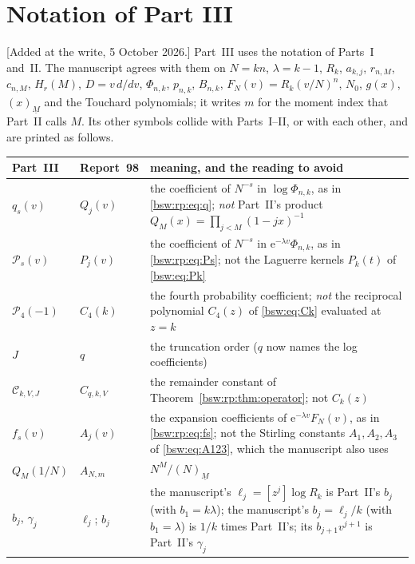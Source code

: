 \documentclass[11pt,letterpaper]{article}
\theoremstyle{definition}
\theoremstyle{remark}
\newcommand{\ee}{\mathrm e}
\newcommand{\fall}[2]{(#1)_{\underline{#2}}}
\begin{document}
\section{Notation of Part III}\label{bsw:ut:sec:notation}

[Added at the write, 5 October 2026.]  Part~III uses the notation of
Parts~I and~II.  The manuscript agrees with them on $N=kn$, $\lambda=k-1$,
$R_k$, $a_{k,j}$, $r_{n,M}$, $c_{n,M}$, $H_r(M)$, $D=v\,d/dv$,
$\Phi_{n,k}$, $p_{n,k}$, $B_{n,k}$, $F_N(v)=R_k(v/N)^n$, $N_0$, $g(x)$,
$\fall xM$ and the Touchard polynomials; it writes $m$ for the moment index
that Part~II calls $M$.  Its other
symbols collide with Parts~I--II, or with each other, and are printed
as follows.

\begin{center}\small
\begin{tabular}{>{\raggedright\arraybackslash}p{}>{\raggedright\arraybackslash}p{}>{\raggedright\arraybackslash}p{}}
\toprule
Part~III & Report~98 & meaning, and the reading to avoid\\
\midrule
$q_s(v)$ & $Q_j(v)$ & the coefficient of $N^{-s}$ in $\log\Phi_{n,k}$, as in
 \eqref{bsw:rp:eq:q}; \emph{not} Part~II's product
 $Q_M(x)=\prod_{j<M}(1-jx)^{-1}$\\
$\mathcal P_s(v)$ & $P_j(v)$ & the coefficient of $N^{-s}$ in
 $\ee^{-\lambda v}\Phi_{n,k}$, as in \eqref{bsw:rp:eq:Ps}; not the
 Laguerre kernels $P_k(t)$ of \eqref{bsw:eq:Pk}\\
$\mathcal P_4(-1)$ & $C_4(k)$ & the fourth probability coefficient; \emph{not}
 the reciprocal polynomial $C_4(z)$ of \eqref{bsw:eq:Ck} evaluated at
 $z=k$\\
$J$ & $q$ & the truncation order ($q$ now names the log coefficients)\\
$\mathcal C_{k,V,J}$ & $C_{q,k,V}$ & the remainder constant of
 Theorem~\ref{bsw:rp:thm:operator}; not $C_k(z)$\\
$f_s(v)$ & $A_j(v)$ & the expansion coefficients of
 $\ee^{-\lambda v}F_N(v)$, as in \eqref{bsw:rp:eq:fs}; not the Stirling
 constants $A_1,A_2,A_3$ of \eqref{bsw:eq:A123}, which the manuscript also
 uses\\
$Q_M(1/N)$ & $A_{N,m}$ & $N^M/\fall NM$\\
$b_j$, $\gamma_j$ & $\ell_j$; $b_j$ & the manuscript's $\ell_j=[z^j]\log R_k$ is
 Part~II's $b_j$ (with $b_1=k\lambda$); the manuscript's
 $b_j=\ell_j/k$ (with $b_1=\lambda$) is $1/k$ times Part~II's; its
 $b_{j+1}v^{j+1}$ is Part~II's $\gamma_j$\\

\end{tabular}
\end{center}
\end{document}
